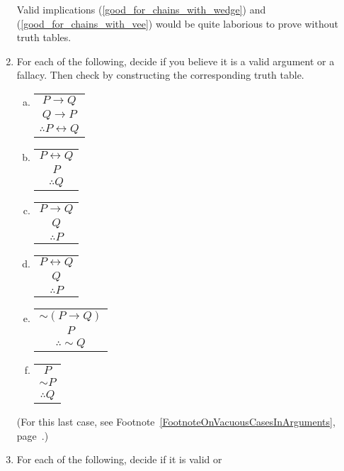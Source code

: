\begin{multicols}{2}
\begin{enumerate}
Valid implications (\ref{good_for_chains_with_wedge}) and
(\ref{good_for_chains_with_vee}) would be quite laborious 
to prove without truth tables. 
\item For each of the following, decide if you believe it is a valid 
argument or a fallacy.  Then check by constructing the corresponding 
truth table.
{\begin{multicols}{2}
\begin{enumerate}[(a)]
\item \begin{tabular}{c} $P\longrightarrow Q$\\ $Q\longrightarrow P$\\
                           \hline $\therefore P\longleftrightarrow Q$
      \end{tabular}\bigskip
\item \begin{tabular}{c}$P\longleftrightarrow Q$\\ $P$\\\hline $\therefore Q$
      \end{tabular}\bigskip
\item \begin{tabular}{c}$P\longrightarrow Q$\\ $Q$\\ \hline $\therefore P$
      \end{tabular}
\item \begin{tabular}{c}$P\longleftrightarrow Q$\\$Q$\\\hline$\therefore P$
      \end{tabular}\bigskip
\item \begin{tabular}{c}$\sim(P\longrightarrow Q)$\\$P$\\\hline
                        $\therefore\sim Q$
      \end{tabular}\bigskip
\item \begin{tabular}{c}$P$\\$\sim P$\\\hline$\therefore Q$\end{tabular}
\bigskip
\end{enumerate}
\end{multicols}}
(For this last case,
see Footnote~\ref{FootnoteOnVacuousCasesInArguments}, 
page~\pageref{FootnoteOnVacuousCasesInArguments}.)
\item For each of the following, decide if it is valid or

\end{enumerate}
\end{multicols}
